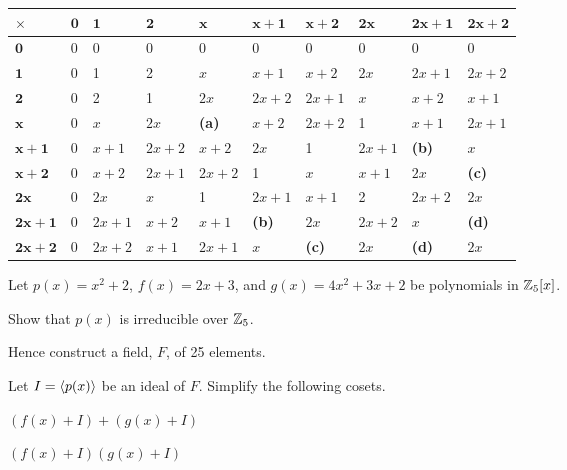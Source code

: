 \begin{example}
    \begin{table}[H]
        \centering
        \begin{tabular}{|l|l|l|l|l|l|l|l|l|l|}
            \hline
            $\boldsymbol{\times}$ & $\boldsymbol{0}$ & $\boldsymbol{1}$ & $\boldsymbol{2}$ & $\boldsymbol{x}$ & $\boldsymbol{x+1}$ & $\boldsymbol{x+2}$ & $\boldsymbol{2x}$ & $\boldsymbol{2x+1}$ & $\boldsymbol{2x+2}$ \\ \hline
            $\boldsymbol{0}$ & 0 & 0 & 0 & 0 & 0 & 0 & 0 & 0 & 0 \\ \hline
            $\boldsymbol{1}$ & 0 & 1 & 2 & $x$ & $x+1$ & $x+2$ & $2x$ & $2x+1$ & $2x+2$ \\ \hline
            $\boldsymbol{2}$ & 0 & 2 & 1 & $2x$ & $2x+2$ & $2x+1$ & $x$ & $x+2$ & $x+1$ \\ \hline
            $\boldsymbol{x}$ & 0 & $x$ & $2x$ & \textbf{(a)} & $x+2$ & $2x+2$ & 1 & $x+1$ & $2x+1$ \\ \hline
            $\boldsymbol{x+1}$ & 0 & $x+1$ & $2x+2$ & $x+2$ & $2x$ & 1 & $2x+1$ & \textbf{(b)} & $x$ \\ \hline
            $\boldsymbol{x+2}$ & 0 & $x+2$ & $2x+1$ & $2x+2$ & 1 & $x$ & $x+1$ & $2x$ & \textbf{(c)} \\ \hline
            $\boldsymbol{2x}$ & 0 & $2x$ & $x$ & 1 & $2x+1$ & $x+1$ & 2 & $2x+2$ & $2x$ \\ \hline
            $\boldsymbol{2x+1}$ & 0 & $2x+1$ & $x+2$ & $x+1$ & \textbf{(b)} & $2x$ & $2x+2$ & $x$ & \textbf{(d)} \\ \hline
            $\boldsymbol{2x+2}$ & 0 & $2x+2$ & $x+1$ & $2x+1$ & $x$ & \textbf{(c)} & $2x$ & \textbf{(d)} & $2x$ \\ \hline
        \end{tabular}
    \end{table}

\end{example}

\begin{exercise}
    Let $p(x) = x^2 + 2$, $f(x) = 2x+3$, and $g(x) = 4x^2+3x+2$ be polynomials in $\mathbb{Z}_5[x]$.
    \begin{partquestions}{\roman*}
        \item Show that $p(x)$ is irreducible over $\mathbb{Z}_5$.
        \item Hence construct a field, $F$, of 25 elements.
        \item Let $I = \left\langle p(x)\right\rangle$ be an ideal of $F$.  Simplify the following cosets.
        \begin{partquestions}{\alph*}
            \item $(f(x) + I) + (g(x) + I)$
            \item $(f(x) + I)(g(x) + I)$
        \end{partquestions}
    \end{partquestions}
\end{exercise}

